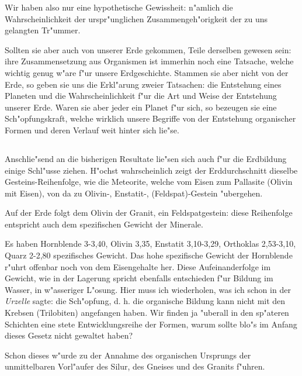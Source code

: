 \documentclass[a4paper, 11pt, oneside]{article}
\begin{document}
Wir haben also nur eine hypothetische Gewissheit: n"amlich die Wahrscheinlichkeit der urspr"unglichen Zusammengeh"origkeit der zu uns gelangten Tr"ummer.

Sollten sie aber auch von unserer Erde gekommen, Teile derselben gewesen sein: ihre Zusammensetzung aus Organismen ist immerhin noch eine Tatsache, welche wichtig genug w"are f"ur unsere Erdgeschichte. Stammen sie aber nicht von der Erde, so geben sie uns die Erkl"arung zweier Tatsachen: die Entstehung eines Planeten und die Wahrscheinlichkeit f"ur die Art und Weise der Entstehung unserer Erde. Waren sie aber jeder ein Planet f"ur sich, so bezeugen sie eine Sch"opfungskraft, welche wirklich unsere Begriffe von der Entstehung organischer Formen und deren Verlauf weit hinter sich lie"se.
\clearpage
\subsection{}
\paragraph{}
Anschlie"send an die bisherigen Resultate lie"sen sich auch f"ur die Erdbildung einige Schl"usse ziehen. H"ochst wahrscheinlich zeigt der Erddurchschnitt dieselbe Gesteins-Reihenfolge, wie die Meteorite, welche vom Eisen zum Pallasite (Olivin mit Eisen), von da zu Olivin-, Enstatit-, (Feldspat)-Gestein "ubergehen.

Auf der Erde folgt dem Olivin der Granit, ein Feldspatgestein: diese Reihenfolge entspricht auch dem spezifischen Gewicht der Minerale.

Es haben Hornblende 3-3,40, Olivin 3,35, Enstatit 3,10-3,29, Orthoklas 2,53-3,10, Quarz 2-2,80 spezifisches Gewicht. Das hohe spezifische Gewicht der Hornblende r"uhrt offenbar noch von dem Eisengehalte her. Diese Aufeinanderfolge im Gewicht, wie in der Lagerung spricht ebenfalls entschieden f"ur Bildung im Wasser, in w"asseriger L"osung. Hier muss ich wiederholen, was ich schon in der \emph{Urzelle} sagte: die Sch"opfung, d. h. die organische Bildung kann nicht mit den Krebsen (Trilobiten) angefangen haben. Wir finden ja "uberall in den sp"ateren Schichten eine stete Entwicklungsreihe der Formen, warum sollte blo"s im Anfang dieses Gesetz nicht gewaltet haben?

Schon dieses w"urde zu der Annahme des organischen Ursprungs der unmittelbaren Vorl"aufer des Silur, des Gneises und des Granits f"uhren.
\end{document}
